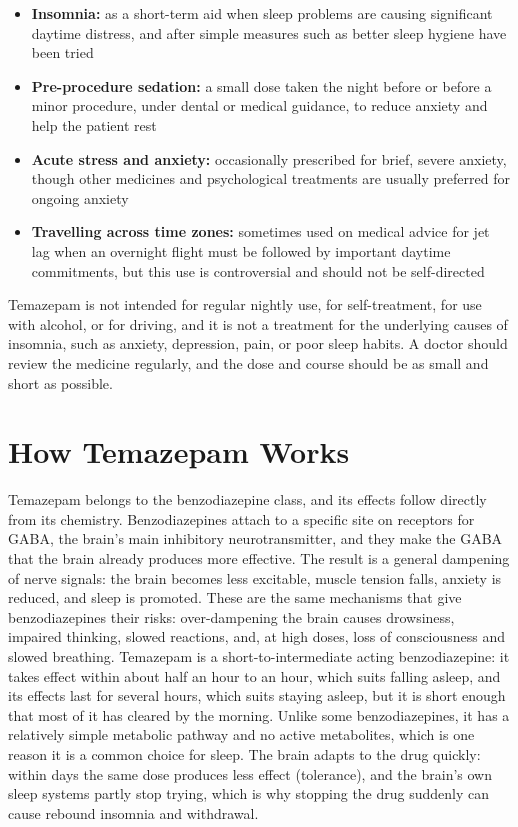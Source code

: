 \begin{itemize}
    \item \textbf{Insomnia:} as a short-term aid when sleep problems are causing significant daytime distress, and after simple measures such as better sleep hygiene have been tried
    \item \textbf{Pre-procedure sedation:} a small dose taken the night before or before a minor procedure, under dental or medical guidance, to reduce anxiety and help the patient rest
    \item \textbf{Acute stress and anxiety:} occasionally prescribed for brief, severe anxiety, though other medicines and psychological treatments are usually preferred for ongoing anxiety
    \item \textbf{Travelling across time zones:} sometimes used on medical advice for jet lag when an overnight flight must be followed by important daytime commitments, but this use is controversial and should not be self-directed
\end{itemize}

Temazepam is not intended for regular nightly use, for self-treatment, for use with alcohol, or for driving, and it is not a treatment for the underlying causes of insomnia, such as anxiety, depression, pain, or poor sleep habits. A doctor should review the medicine regularly, and the dose and course should be as small and short as possible.

\section*{How Temazepam Works}
Temazepam belongs to the benzodiazepine class, and its effects follow directly from its chemistry. Benzodiazepines attach to a specific site on receptors for GABA, the brain's main inhibitory neurotransmitter, and they make the GABA that the brain already produces more effective. The result is a general dampening of nerve signals: the brain becomes less excitable, muscle tension falls, anxiety is reduced, and sleep is promoted. These are the same mechanisms that give benzodiazepines their risks: over-dampening the brain causes drowsiness, impaired thinking, slowed reactions, and, at high doses, loss of consciousness and slowed breathing. Temazepam is a short-to-intermediate acting benzodiazepine: it takes effect within about half an hour to an hour, which suits falling asleep, and its effects last for several hours, which suits staying asleep, but it is short enough that most of it has cleared by the morning. Unlike some benzodiazepines, it has a relatively simple metabolic pathway and no active metabolites, which is one reason it is a common choice for sleep. The brain adapts to the drug quickly: within days the same dose produces less effect (tolerance), and the brain's own sleep systems partly stop trying, which is why stopping the drug suddenly can cause rebound insomnia and withdrawal.

